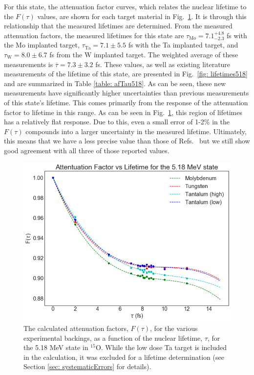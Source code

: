 For this state, the attenuation factor curves, which relates the nuclear lifetime to the $F(\tau)$ values, are shown for each target material in Fig.\ \ref{fig: attFacs518}. It is through this relationship that the measured lifetimes are determined. From the measured attenuation factors, the measured lifetimes for this state are $\tau_{\text{Mo}} = 7.1^{+4.8}_{-2.3}$ fs with the Mo implanted target, $\tau_{\text{Ta}} = 7.1 \pm 5.5$ fs with the Ta implanted target, and $\tau_{\text{W}} = 8.0 \pm 6.7$ fs from the W implanted target. The weighted average of these measurements is $\overline{\tau} = 7.3 \pm 3.2$ fs. These values, as well as existing literature measurements of the lifetime of this state, are presented in Fig.\ \ref{fig: lifetimes518} and are summarized in Table \ref{table: afTau518}. As can be seen, these new measurements have significantly higher uncertainties than previous measurements of this state's lifetime. This comes primarily from the response of the attenuation factor to lifetime in this range. As can be seen in Fig.\ \ref{fig: attFacs518}, this region of lifetimes has a relatively flat response. Due to this, even a small error of 1-2\% in the $F(\tau)$ compounds into a larger uncertainty in the measured lifetime. Ultimately, this means that we have a less precise value than those of Refs.\ \cite{Bertone2001, Schurmann2008, Gill1968} but we still show good agreement with all three of those reported values.


\begin{figure}
\centering
\includegraphics[width=\linewidth]{figures/attFac518.png}
\caption{The calculated attenuation factors, $F(\tau)$, for the various experimental backings, as a function of the nuclear lifetime, $\tau$, for the 5.18 MeV state in $^{15}$O. While the low dose Ta target is included in the calculation, it was excluded for a lifetime determination (see Section \ref{sec: systematicErrors} for details). }
\label{fig: attFacs518}
\end{figure}


